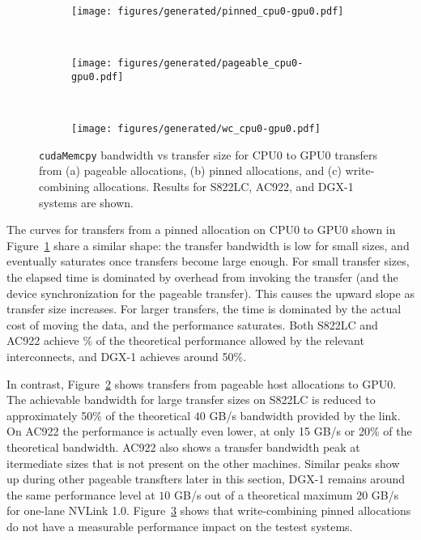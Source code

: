 \begin{figure}[H]
	\centering
	\begin{subfigure}[b]{0.3\textwidth}
		\texttt{[image: figures/generated/pinned\_cpu0-gpu0.pdf]}
		\caption{}
		\label{fig:pinned-cpu0-gpu0}
	\end{subfigure}
	~
	\begin{subfigure}[b]{0.3\textwidth}
		\texttt{[image: figures/generated/pageable\_cpu0-gpu0.pdf]}
		\caption{}
		\label{fig:pageable-cpu0-gpu0}
	\end{subfigure}
	~
	\begin{subfigure}[b]{0.3\textwidth}
		\texttt{[image: figures/generated/wc\_cpu0-gpu0.pdf]}
		\caption{}
		\label{fig:wc-cpu0-gpu0}
	\end{subfigure}
	\caption[\texttt{cudaMemcpy} bandwidth for CPU0-GPU0 transfers.]{
		\texttt{cudaMemcpy} bandwidth vs transfer size for CPU0 to GPU0 transfers from 
		(a) pageable allocations,
		(b) pinned allocations, and
		(c) write-combining allocations.
		Results for S822LC, AC922, and DGX-1 systems are shown.
	}
	\label{fig:pageable-pinned-wc}
\end{figure}


The curves for transfers from a pinned allocation on CPU0 to GPU0 shown in Figure~\ref{fig:pinned-cpu0-gpu0} share a similar shape: the transfer bandwidth is low for small sizes, and eventually saturates once transfers become large enough.
For small transfer sizes, the elapsed time is dominated by overhead from invoking the transfer (and the device synchronization for the pageable transfer).
This causes the upward slope as transfer size increases.
For larger transfers, the time is dominated by the actual cost of moving the data, and the performance saturates.
Both S822LC and AC922 achieve \% of the theoretical performance allowed by the relevant interconnects, and DGX-1 achieves around 50\%.

In contrast, Figure~\ref{fig:pageable-cpu0-gpu0} shows transfers from pageable host allocations to GPU0.
The achievable bandwidth for large transfer sizes on S822LC is reduced to approximately 50\% of the theoretical $40$ GB/s bandwidth provided by the link.
On AC922 the performance is actually even lower, at only 15 GB/s or 20\% of the theoretical bandwidth.
AC922 also shows a transfer bandwidth peak at itermediate sizes that is not present on the other machines.
Similar peaks show up during other pageable transfters later in this section, 
DGX-1 remains around the same performance level at $10$ GB/s out of a theoretical maximum $20$ GB/s for one-lane NVLink 1.0.
Figure~\ref{fig:wc-cpu0-gpu0} shows that write-combining pinned allocations do not have a measurable performance impact on the testest systems.

